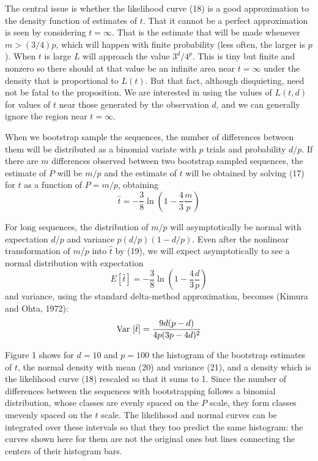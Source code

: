 The central issue is whether the likelihood curve (18) is a good approximation
to the density function of estimates of $t$.  That it cannot be a perfect
approximation is seen by considering $t = \infty$.  That is the estimate
that will be made whenever $m > (3/4)p$, which will happen with finite
probability (less often, the larger is $p$).  When $t$ is large $L$ will
approach the value
$3^d/4^p$.  This is tiny but finite and nonzero so there should at that value be an infinite area
near $t = \infty$ under the
density that is proportional to $L(t)$.  But that fact, although disquieting, need
not be fatal to the proposition.  We are interested in using the values of
$L(t, d)$ for values of $t$ near those generated by the observation $d$, and
we can generally ignore the region near $t = \infty$.

When we bootstrap sample the sequences, the number of differences between
them will be distributed as a binomial variate with $p$ trials and
probability $d/p$.  If there are $m$ differences observed between two bootstrap
sampled sequences, the estimate of $P$ will be $m/p$ and the estimate of
$t$ will be obtained by solving (17) for $t$ as a function of $P = m/p$, obtaining
\begin{equation} %
\hat{t}  =  - \frac{3}{8} \ln \left(1 - \frac{4}{3} \frac{m}{p}\right)
\end{equation}

For long sequences, the distribution of $m/p$ will asymptotically be normal
with expectation $d/p$ and variance $p(d/p)(1-d/p)$.  Even after the nonlinear
transformation of $m/p$ into $\hat{t}$ by (19), we will expect asymptotically
to see a normal distribution with expectation
\begin{equation} %
E[\hat{t}]  =  - \frac{3}{8} \ln \left(1 - \frac{4}{3} \frac{d}{p}\right)
\end{equation}
and variance, using the standard delta-method approximation, becomes (Kimura
and Ohta, 1972):
\begin{equation} %
{\rm Var}~[\hat{t}]  =  \frac{9 d (p-d)}{4p(3p-4d)^2}
\end{equation}

Figure 1 shows for $d = 10$ and $p = 100$ the histogram of the bootstrap
estimates of $t$,
the normal density with mean (20) and variance (21),
 and a density
which is the likelihood curve (18) rescaled so that it sums to 1.  Since the
number of differences between the sequences with bootstrapping follows
a binomial distribution, whose classes are evenly spaced on the $P$ scale,
they form classes unevenly spaced on the $t$ scale.  The likelihood and normal
curves can be integrated over these intervals so that they too predict the
same histogram: the curves shown here for them are not the original ones but
lines connecting the centers of their histogram bars.

